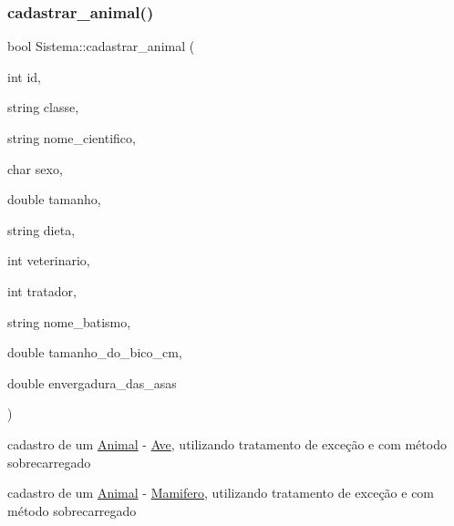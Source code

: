 \subsubsection{\texorpdfstring{cadastrar\_animal()}{cadastrar\_animal()}\hspace{0.1cm}{\footnotesize\ttfamily [4/12]}}
{\footnotesize\ttfamily bool Sistema\+::cadastrar\+\_\+animal (\begin{DoxyParamCaption}\item[{int}]{id,  }\item[{string}]{classe,  }\item[{string}]{nome\+\_\+cientifico,  }\item[{char}]{sexo,  }\item[{double}]{tamanho,  }\item[{string}]{dieta,  }\item[{int}]{veterinario,  }\item[{int}]{tratador,  }\item[{string}]{nome\+\_\+batismo,  }\item[{double}]{tamanho\+\_\+do\+\_\+bico\+\_\+cm,  }\item[{double}]{envergadura\+\_\+das\+\_\+asas }\end{DoxyParamCaption})}



cadastro de um \mbox{\hyperlink{class_animal}{Animal}} -\/ \mbox{\hyperlink{class_ave}{Ave}}, utilizando tratamento de exceção e com método sobrecarregado 

cadastro de um \mbox{\hyperlink{class_animal}{Animal}} -\/ \mbox{\hyperlink{class_mamifero}{Mamifero}}, utilizando tratamento de exceção e com método sobrecarregado \mbox{\label{class_sistema_aaa33ed8820b6a9f9c14f3f4f5ab2df4e}} 
